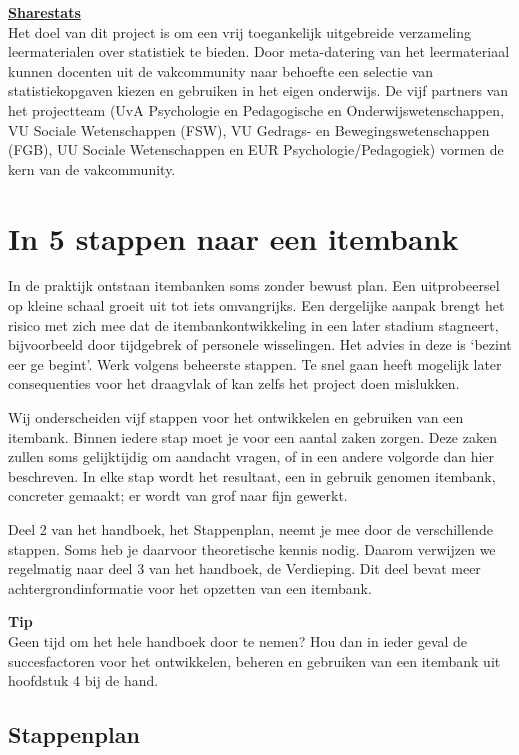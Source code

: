 \documentclass[
]{book}
\begin{document}
\textbf{\href{https://www.sharestats.nl}{Sharestats}}\\
Het doel van dit project is om een vrij toegankelijk uitgebreide verzameling leermaterialen over statistiek te bieden. Door meta-datering van het leermateriaal kunnen docenten uit de vakcommunity naar behoefte een selectie van statistiekopgaven kiezen en gebruiken in het eigen onderwijs. De vijf partners van het projectteam (UvA Psychologie en Pedagogische en Onderwijswetenschappen, VU Sociale Wetenschappen (FSW), VU Gedrags- en Bewegingswetenschappen (FGB), UU Sociale Wetenschappen en EUR Psychologie/Pedagogiek) vormen de kern van de vakcommunity.

\hypertarget{in-5-stappen-naar-een-itembank}{%
\section{In 5 stappen naar een itembank}\label{in-5-stappen-naar-een-itembank}}

In de praktijk ontstaan itembanken soms zonder bewust plan. Een uitprobeersel op kleine schaal groeit uit tot iets omvangrijks. Een dergelijke aanpak brengt het risico met zich mee dat de itembankontwikkeling in een later stadium stagneert, bijvoorbeeld door tijdgebrek of personele wisselingen. Het advies in deze is `bezint eer ge begint'. Werk volgens beheerste stappen. Te snel gaan heeft mogelijk later consequenties voor het draagvlak of kan zelfs het project doen mislukken.

Wij onderscheiden vijf stappen voor het ontwikkelen en gebruiken van een itembank. Binnen iedere stap moet je voor een aantal zaken zorgen. Deze zaken zullen soms gelijktijdig om aandacht vragen, of in een andere volgorde dan hier beschreven. In elke stap wordt het resultaat, een in gebruik genomen itembank, concreter gemaakt; er wordt van grof naar fijn gewerkt.

Deel 2 van het handboek, het Stappenplan, neemt je mee door de verschillende stappen. Soms heb je daarvoor theoretische kennis nodig. Daarom verwijzen we regelmatig naar deel 3 van het handboek, de Verdieping. Dit deel bevat meer achtergrondinformatie voor het opzetten van een itembank.

\textbf{Tip}\\
Geen tijd om het hele handboek door te nemen? Hou dan in ieder geval de succesfactoren voor het ontwikkelen, beheren en gebruiken van een itembank uit hoofdstuk 4 bij de hand.

\hypertarget{stappenplan}{%
\subsection{Stappenplan}\label{stappenplan}}
\end{document}
